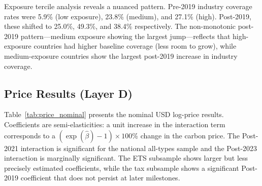 \documentclass[12pt,a4paper]{article}
\begin{document}
Exposure tercile analysis reveals a nuanced pattern. Pre-2019 industry coverage rates were 5.9\% (low exposure), 23.8\% (medium), and 27.1\% (high). Post-2019, these shifted to 25.0\%, 49.3\%, and 38.4\% respectively. The non-monotonic post-2019 pattern---medium exposure showing the largest jump---reflects that high-exposure countries had higher baseline coverage (less room to grow), while medium-exposure countries show the largest post-2019 increase in industry coverage.

\subsection{Price Results (Layer D)}\label{sec:price_results}

Table~\ref{tab:price_nominal} presents the nominal USD log-price results. Coefficients are semi-elasticities: a unit increase in the interaction term corresponds to a $(\exp(\hat{\beta})-1)\times 100$\% change in the carbon price. The Post-2021 interaction is significant for the national all-types sample and the Post-2023 interaction is marginally significant. The ETS subsample shows larger but less precisely estimated coefficients, while the tax subsample shows a significant Post-2019 coefficient that does not persist at later milestones.
\end{document}

